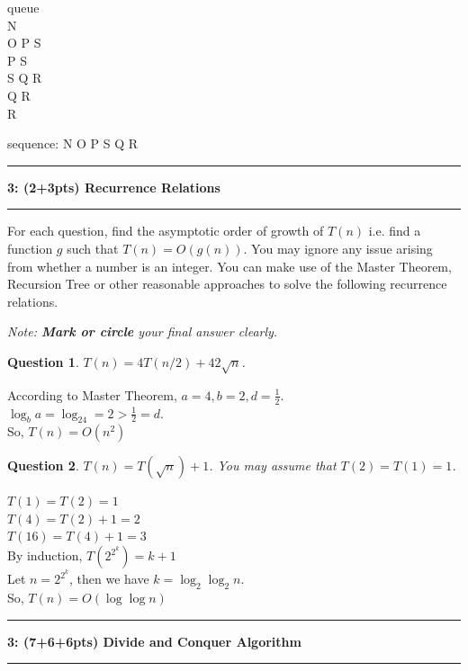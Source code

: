 \documentclass{article}
\newcommand\question[2]{\vspace{.25in}\hrule\textbf{#1: #2}\vspace{.5em}\hrule\vspace{.10in}}
\newtheorem{Q}{Question}
\begin{document}
queue\\
N\\
O P S\\
P S\\
S Q R\\
Q R\\
R

sequence: N O P S Q R

\newpage


\question{3}{(2+3pts) Recurrence Relations}
For each question, find the asymptotic order of growth of $T(n)$ i.e. find a function $g$ such that $T(n) = O(g(n))$. You may ignore any issue arising from whether a number is an integer. You can make use of the Master Theorem, Recursion Tree or other reasonable approaches to solve the following recurrence relations.

\textit{Note: \textbf{Mark or circle} your final answer clearly.\\ }

\begin{Q} $T(n) = 4T(n/2) + 42\sqrt{n}$.
\end{Q}

According to Master Theorem, $a=4,b=2,d=\frac{1}{2}$.\\
$\log_{b}a=\log_24=2>\frac{1}{2}=d$.\\
So, $\boxed{T(n)=O(n^2)}$

\vspace{6cm}
\begin{Q} $T(n) = T(\sqrt{n}) + 1$. You may assume that $T(2)=T(1)=1$.
\end{Q}

$T(1)=T(2)=1$\\
$T(4)=T(2)+1=2$\\
$T(16)=T(4)+1=3$\\
By induction, $T(2^{2^k})=k+1$\\
Let $n=2^{2^k}$, then we have $k=\log_2\log_2n$.\\
So, $\boxed{T(n)=O(\log{\log n})}$

\newpage
\question{3}{(7+6+6pts) Divide and Conquer Algorithm}
\end{document}
